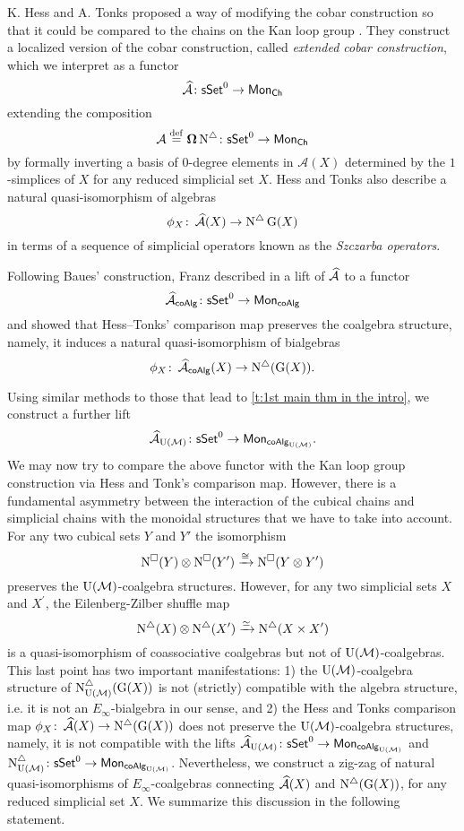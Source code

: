 K. Hess and A. Tonks proposed a way of modifying the cobar construction so that it could be compared to the chains on the Kan loop group \cite{hess2010cobar}.
They construct a localized version of the cobar construction, called \textit{extended cobar construction}, which we interpret as a functor
\[
\operatorname{\mathcal{\widehat{A}}} \colon \mathsf{sSet}^0 \to \mathsf{Mon}_{\mathsf{Ch}}
\]
extending the composition 
\[
\operatorname{\mathcal{A}} \stackrel{\mathrm{def}}{=} \operatorname{\mathbf{\Omega}} \operatorname{N^{\triangle}} \colon \mathsf{sSet}^0 \to \mathsf{Mon}_{\mathsf{Ch}}
\]
by formally inverting a basis of $0$-degree elements in $\mathcal{A}(X)$ determined by the $1$-simplices of $X$ for any reduced simplicial set $X$.
Hess and Tonks also describe a natural quasi-isomorphism of algebras
\[
\phi_X \colon \operatorname{\mathcal{\widehat{A}}}(X) \to \operatorname{N^{\triangle}} \operatorname{G}(X)
\]
in terms of a sequence of simplicial operators known as the \textit{Szczarba operators}. 

Following Baues’ construction, Franz described in \cite{franz2020szczarba} a lift of $\operatorname{\mathcal{\widehat{A}}}$ to a functor
\[
\operatorname{\mathcal{\widehat{A}}}_{\mathsf{coAlg}} \colon \mathsf{sSet}^0 \to \mathsf{Mon}_{\mathsf{coAlg}}
\]
and showed that Hess--Tonks' comparison map preserves the coalgebra structure, namely, it induces a natural quasi-isomorphism of bialgebras
\[
\phi_X \colon \operatorname{\mathcal{\widehat{A}}}_{\mathsf{coAlg}}(X) \to \operatorname{N^{\triangle}} (\operatorname{G}(X)).
\]

Using similar methods to those that lead to \cref{t:1st main thm in the intro}, we construct a further lift
\[
\operatorname{\mathcal{\widehat{A}}}_{\operatorname{U}(\mathcal{M})} \colon \mathsf{sSet}^0 \to \mathsf{Mon}_{\mathsf{coAlg}_{\operatorname{U}(\mathcal{M})}}.
\]
We may now try to compare the above functor with the Kan loop group construction via Hess and Tonk's comparison map.
However, there is a fundamental asymmetry between the interaction of the cubical chains and simplicial chains with the monoidal structures that we have to take into account.
For any two cubical sets $Y$ and $Y'$ the isomorphism
\[
\operatorname{N^{\square}}(Y) \otimes \operatorname{N^{\square}}(Y') \xrightarrow{\cong} \operatorname{N^{\square}}(Y \otimes Y')
\]
preserves the ${\operatorname{U}(\mathcal{M})}$-coalgebra structures.
However, for any two simplicial sets $X$ and $X^\prime$, the Eilenberg-Zilber shuffle map 
\[
\operatorname{N^{\triangle}}(X) \otimes \operatorname{N^{\triangle}}(X^\prime) \xrightarrow{\simeq} \operatorname{N^{\triangle}}(X \times X^\prime)
\]
is a quasi-isomorphism of coassociative coalgebras but not of ${\operatorname{U}(\mathcal{M})}$-coalgebras.
This last point has two important manifestations: 1) the ${\operatorname{U}(\mathcal{M})}$-coalgebra structure of $\operatorname{N^{\triangle}_{{\operatorname{U}(\mathcal{M})}}}(\operatorname{G}(X))$ is not (strictly) compatible with the algebra structure, i.e. it is not an $E_{\infty}$-bialgebra in our sense, and 2) the Hess and Tonks comparison map $\phi_X \colon \operatorname{\mathcal{\widehat{A}}}(X) \to \operatorname{N^{\triangle}}(\operatorname{G}(X))$ does not preserve the ${\operatorname{U}(\mathcal{M})}$-coalgebra structures, namely, it is not compatible with the lifts $\operatorname{\mathcal{\widehat{A}}}_{\operatorname{U}(\mathcal{M})} \colon \mathsf{sSet}^0 \to \mathsf{Mon}_{\mathsf{coAlg}_{\operatorname{U}(\mathcal{M})}}$
and $\operatorname{N^{\triangle}_{{\operatorname{U}(\mathcal{M})}}} \colon \mathsf{sSet}^0 \to \mathsf{Mon}_{\mathsf{coAlg}_{\operatorname{U}(\mathcal{M})}}$.
Nevertheless, we construct a zig-zag of natural quasi-isomorphisms of $E_{\infty}$-coalgebras connecting $\operatorname{\mathcal{\widehat{A}}}(X)$ and $\operatorname{N^{\triangle}}(\operatorname{G}(X))$, for any reduced simplicial set $X$. We summarize this discussion in the following statement.

